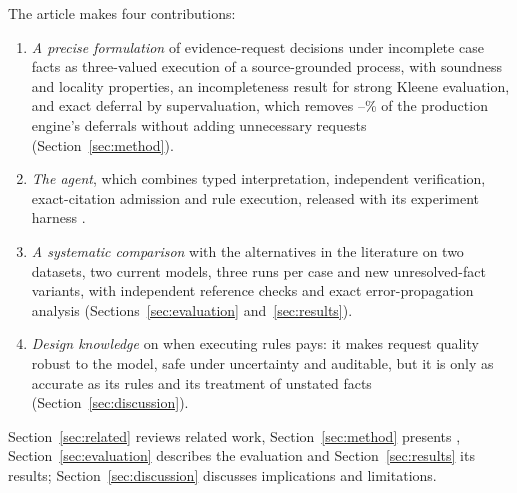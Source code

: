 The article makes four contributions:
\begin{enumerate}[leftmargin=1.5em]
\item \emph{A precise formulation} of evidence-request decisions under incomplete case facts as three-valued execution of a source-grounded process, with soundness and locality properties, an incompleteness result for strong Kleene evaluation, and exact deferral by supervaluation, which removes \tenTerraExactCut--\tenLunaExactCut\% of the production engine's deferrals without adding unnecessary requests (Section~\ref{sec:method}).
\item \emph{The \casepath agent}, which combines typed interpretation, independent verification, exact-citation admission and rule execution, released with its experiment harness \cite{casepath2026repo}.
\item \emph{A systematic comparison} with the alternatives in the literature on two datasets, two current models, three runs per case and new unresolved-fact variants, with independent reference checks and exact error-propagation analysis (Sections~\ref{sec:evaluation} and~\ref{sec:results}).
\item \emph{Design knowledge} on when executing rules pays: it makes request quality robust to the model, safe under uncertainty and auditable, but it is only as accurate as its rules and its treatment of unstated facts (Section~\ref{sec:discussion}).
\end{enumerate}
Section~\ref{sec:related} reviews related work, Section~\ref{sec:method} presents \casepath, Section~\ref{sec:evaluation} describes the evaluation and Section~\ref{sec:results} its results; Section~\ref{sec:discussion} discusses implications and limitations.
